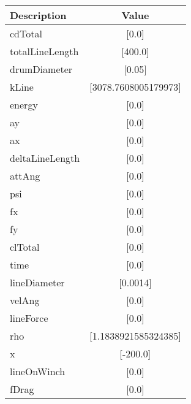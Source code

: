        \begin{center}

            \begin{tabular}{|l|c|}

               \hline

Description & Value  \\ \hline \hline 

cdTotal & [0.0] \\ \hline 

totalLineLength & [400.0] \\ \hline 

drumDiameter & [0.05] \\ \hline 

kLine & [3078.7608005179973] \\ \hline 

energy & [0.0] \\ \hline 

ay & [0.0] \\ \hline 

ax & [0.0] \\ \hline 

deltaLineLength & [0.0] \\ \hline 

attAng & [0.0] \\ \hline 

psi & [0.0] \\ \hline 

fx & [0.0] \\ \hline 

fy & [0.0] \\ \hline 

clTotal & [0.0] \\ \hline 

time & [0.0] \\ \hline 

lineDiameter & [0.0014] \\ \hline 

velAng & [0.0] \\ \hline 

lineForce & [0.0] \\ \hline 

rho & [1.1838921585324385] \\ \hline 

x & [-200.0] \\ \hline 

lineOnWinch & [0.0] \\ \hline 

fDrag & [0.0] \\ \hline 


\end{tabular}
\end{center}
